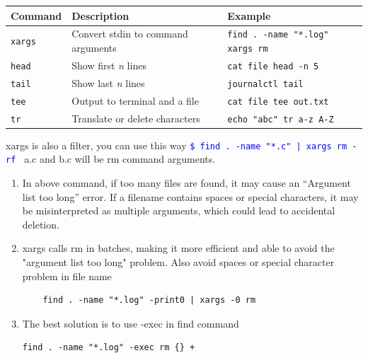 \documentclass[paper=8.5in:11in, twoside, 12pt, pagesize=pdftex]{book}
\newcommand{\linuxcommand}[1]{\texttt{\textcolor{blue}{\$ #1 \Pisymbol{psy}{191}}}}
\begin{document}
\begin{tabular}{|l|p{6.5cm}|l|}
	\hline
	\textbf{Command} & \textbf{Description} & \textbf{Example} \\ \hline
	\texttt{xargs}   & Convert stdin to command arguments     & \texttt{find . -name "*.log" \textbar{} xargs rm} \\ \hline
	\texttt{head}    & Show first \textit{n} lines            & \texttt{cat file \textbar{} head -n 5} \\ \hline
	\texttt{tail}    & Show last \textit{n} lines             & \texttt{journalctl \textbar{} tail} \\ \hline
	\texttt{tee}     & Output to terminal and a file          & \texttt{cat file \textbar{} tee out.txt} \\ \hline
	\texttt{tr}      & Translate or delete characters         & \texttt{echo "abc" \textbar{} tr a-z A-Z} \\ \hline
\end{tabular}

xargs is also a filter, you can use this way \linuxcommand{find . -name "*.c" | xargs rm -rf } a.c and b.c will be rm command arguments.

\begin{enumerate}
\begin{lstlisting}
rm $(find . -name "*.log")  #1 
\end{lstlisting}

	\item In above command, if too many files are found, it may cause an “Argument list too long” error. If a filename contains spaces or special characters, it may be misinterpreted as multiple arguments, which could lead to accidental deletion.
	
\item xargs calls rm in batches, making it more efficient and able to avoid the "argument list too long" problem. Also avoid spaces or special character problem in file name
\begin{lstlisting}
	find . -name "*.log" -print0 | xargs -0 rm
\end{lstlisting}	
	
	
	\item The best solution is to use -exec in find command
\begin{lstlisting}
find . -name "*.log" -exec rm {} +
\end{lstlisting}

\end{enumerate}
\end{document}
